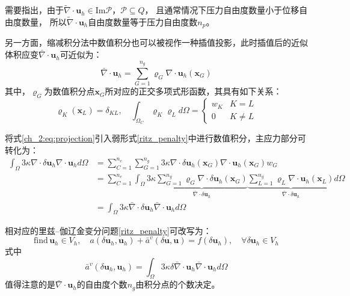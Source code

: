 需要指出，由于$\tilde \nabla \cdot \boldsymbol u_h \in \mathrm{Im} \mathcal P$，$\mathcal P \subseteq Q$，
且通常情况下压力自由度数量小于位移自由度数量，
所以$\tilde \nabla \cdot \boldsymbol u_h$自由度数量等于压力自由度数$n_p$。

另一方面，缩减积分法中数值积分也可以被视作一种插值投影\cite{}，此时插值后的近似体积应变$\bar \nabla \cdot \boldsymbol u_h$可近似为：
\begin{equation}\label{ch_2:eq:projection}
    \bar \nabla \cdot \boldsymbol u_h = \sum_{G=1}^{n_g} \varrho_G \nabla \cdot \boldsymbol u_h(\boldsymbol x_G)
\end{equation}
其中，$\varrho_G$为数值积分点$\boldsymbol x_G$所对应的正交多项式形函数，其具有如下关系：
\begin{equation}
    \varrho_K(\boldsymbol x_L) = \delta_{KL},\quad
    \int_{\Omega_C} \varrho_K \varrho_L d\Omega = 
    \begin{cases}
        w_K  & K = L \\
        0 & K \ne L
    \end{cases}
\end{equation}

将式\eqref{ch_2:eq:projection}引入弱形式\eqref{ritz_penalty}中进行数值积分，主应力部分可转化为：
\begin{equation}\label{projection_penalty}
    \begin{split}
        \int_\Omega 3\kappa \nabla \cdot \delta \boldsymbol u_h \nabla \cdot \boldsymbol u_h d\Omega
        &= \sum_{C=1}^{n_e} \sum_{G=1}^{n_g} 3\kappa \nabla \cdot \delta \boldsymbol u_h(\boldsymbol x_G) \nabla \cdot \boldsymbol u_h(\boldsymbol x_G) w_G \\
        &= \sum_{C=1}^{n_e} \int_\Omega 3\kappa 
        \underbrace{
            \sum_{G= 1}^{n_g} \varrho_G \nabla \cdot \delta \boldsymbol u_h(\boldsymbol x_G)
        }_{\bar \nabla \cdot \delta \boldsymbol u_h}
        \underbrace{
            \sum_{L= 1}^{n_g}  \varrho_L\nabla \cdot \boldsymbol u_h(\boldsymbol x_L)
        }_{\bar \nabla \cdot \delta \boldsymbol u_h} d\Omega  \\
        &=\int_\Omega 3\kappa \bar\nabla \cdot \delta \boldsymbol u_h \bar\nabla \cdot \boldsymbol u_h d\Omega
    \end{split}
\end{equation}

相对应的里兹--伽辽金变分问题\eqref{ritz_penalty}可改写为：
\begin{equation}\label{ritz_penalty_new}
    \text{find}\, \boldsymbol u_h \in V_h, \quad
    a(\delta \boldsymbol u_h, \boldsymbol u_h) + \bar a^v(\delta \boldsymbol u, \boldsymbol u) =
    f(\delta \boldsymbol u_h),
    \quad \forall \delta \boldsymbol u_h \in V_h
\end{equation}
式中
\begin{equation}
    \bar a^v(\delta \boldsymbol u_h, \boldsymbol u_h) = 
    \int_\Omega 3\kappa \delta \bar \nabla\cdot \boldsymbol u_h \bar \nabla \cdot \boldsymbol u_h d\Omega
\end{equation}
值得注意的是$\bar \nabla \cdot \boldsymbol u_h$的自由度个数$n_g$由积分点的个数决定。

